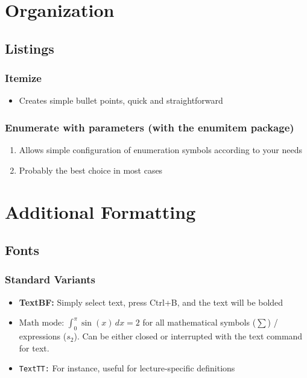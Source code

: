 \documentclass{scrartcl}
\author{\myauthor}
\title{\mytitle}
\subtitle{\mysubtitle}
\begin{document}

\maketitle
\thispagestyle{empty} %
\tableofcontents  %
\thispagestyle{empty} %
\newpage
\setcounter{page}{1}

\section{Organization}
\subsection{Listings}
\subsubsection{Itemize}
\begin{itemize}
	\item Creates simple bullet points, quick and straightforward
\end{itemize}
\subsubsection{Enumerate with parameters (with the enumitem package)}
\begin{enumerate}[label=\alph*)]
	\item Allows simple configuration of enumeration symbols according to your needs
	\item Probably the best choice in most cases
\end{enumerate}

\section{Additional Formatting}
\subsection{Fonts}
\subsubsection{Standard Variants}
\begin{itemize}
	\item \textbf{TextBF:} Simply select text, press Ctrl+B, and the text will be bolded
	\item $\text{Math mode: } \int_{0}^{\pi} \sin(x) \, dx = 2$ for all mathematical symbols ($\sum$) / expressions ($s_2$). Can be either closed or interrupted with the text command for text.
	\item \texttt{TextTT:} For instance, useful for lecture-specific definitions
\end{itemize}
\end{document}
